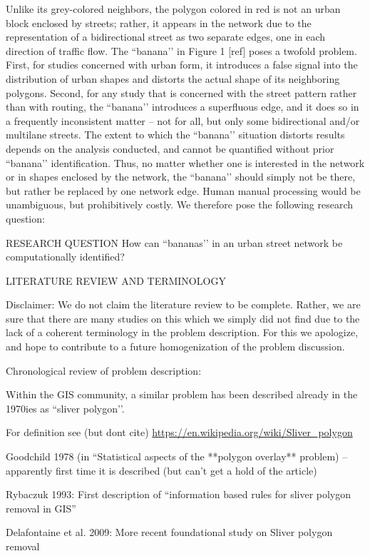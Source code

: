 Unlike its grey-colored neighbors, the polygon colored in red is not an urban block enclosed by streets; rather, it appears in the network due to the representation of a bidirectional street as two separate edges, one in each direction of traffic flow. The ``banana’’ in Figure 1 [ref] poses a twofold problem. First, for studies concerned with urban form, it introduces a false signal into the distribution of urban shapes and distorts the actual shape of its neighboring polygons. Second, for any study that is concerned with the street pattern rather than with routing, the ``banana’’ introduces a superfluous edge, and it does so in a frequently inconsistent matter – not for all, but only some bidirectional and/or multilane streets. The extent to which the ``banana’’ situation distorts results depends on the analysis conducted, and cannot be quantified without prior ``banana’’ identification. Thus, no matter whether one is interested in the network or in shapes enclosed by the network, the ``banana’’ should simply not be there, but rather be replaced by one network edge. Human manual processing would be unambiguous, but prohibitively costly. We therefore pose the following research question:


RESEARCH QUESTION
How can ``bananas’’ in an urban street network be computationally identified?


LITERATURE REVIEW AND TERMINOLOGY

Disclaimer: We do not claim the literature review to be complete. Rather, we are sure that there are many studies on this which we simply did not find due to the lack of a coherent terminology in the problem description. For this we apologize, and hope to contribute to a future homogenization of the problem discussion.

Chronological review of problem description:

Within the GIS community, a similar problem has been described already in the 1970ies as ``sliver polygon’’. 

For definition see (but dont cite) \url{https://en.wikipedia.org/wiki/Sliver_polygon} 

Goodchild 1978 (in “Statistical aspects of the **polygon overlay** problem) – apparently first time it is described (but can’t get a hold of the article)

Rybaczuk 1993: First description of “information based rules for sliver polygon removal in GIS”

Delafontaine et al. 2009: More recent foundational study on Sliver polygon removal



